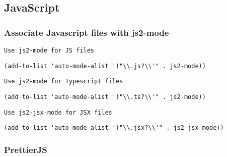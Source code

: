 \documentclass[11pt]{article}
\begin{document}
\subsection*{JavaScript}
\label{sec:org5378f6e}

\subsubsection*{Associate Javascript files with js2-mode}
\label{sec:org6f29420}

\begin{verbatim}
Use js2-mode for JS files  
\end{verbatim}


\begin{verbatim}
(add-to-list 'auto-mode-alist '("\\.js?\\'" . js2-mode))
\end{verbatim}

\begin{verbatim}
Use js2-mode for Typescript files  
\end{verbatim}


\begin{verbatim}
(add-to-list 'auto-mode-alist '("\\.ts?\\'" . js2-mode))
\end{verbatim}

\begin{verbatim}
Use js2-jsx-mode for JSX files  
\end{verbatim}

\begin{verbatim}
(add-to-list 'auto-mode-alist '("\\.jsx?\\'" . js2-jsx-mode))
\end{verbatim}

\subsubsection*{PrettierJS}
\label{sec:org2d6060b}
\end{document}
